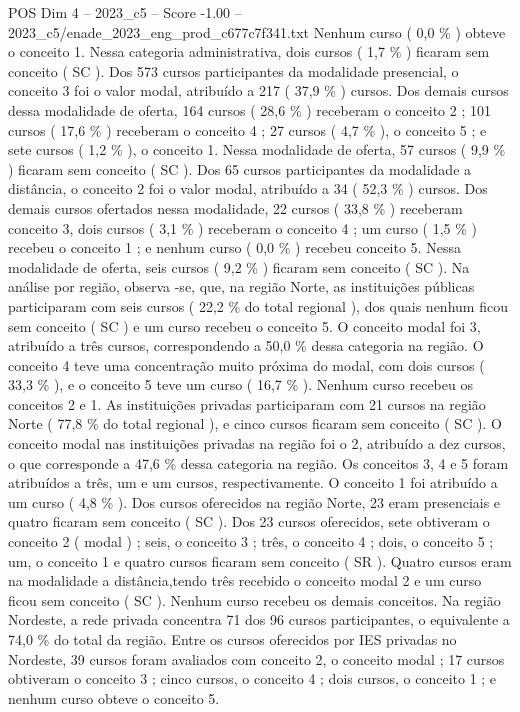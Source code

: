 \begin{textsample}{POS Dim 4 – 2023\_c5 – Score -1.00 – 2023\_c5/enade\_2023\_eng\_prod\_c677c7f341.txt}
Nenhum curso ( 0,0 \% ) obteve o conceito 1.
Nessa categoria administrativa, dois cursos ( 1,7 \% ) ficaram sem conceito ( SC ).
Dos 573 cursos participantes da modalidade presencial, o conceito 3 foi o valor modal, atribuído a 217 ( 37,9 \% ) cursos.
Dos demais cursos dessa modalidade de oferta, 164 cursos ( 28,6 \% ) receberam o conceito 2 ; 101 cursos ( 17,6 \% ) receberam o conceito 4 ; 27 cursos ( 4,7 \% ), o conceito 5 ; e sete cursos ( 1,2 \% ), o conceito 1.
Nessa modalidade de oferta, 57 cursos ( 9,9 \% ) ficaram sem conceito ( SC ).
Dos 65 cursos participantes da modalidade a distância, o conceito 2 foi o valor modal, atribuído a 34 ( 52,3 \% ) cursos.
Dos demais cursos ofertados nessa modalidade, 22 cursos ( 33,8 \% ) receberam conceito 3, dois cursos ( 3,1 \% ) receberam o conceito 4 ; um curso ( 1,5 \% ) recebeu o conceito 1 ; e nenhum curso ( 0,0 \% ) recebeu conceito 5.
Nessa modalidade de oferta, seis cursos ( 9,2 \% ) ficaram sem conceito ( SC ).
Na análise por região, observa -se, que, na região Norte, as instituições públicas participaram com seis cursos ( 22,2 \% do total regional ), dos quais nenhum ficou sem conceito ( SC ) e um curso recebeu o conceito 5.
O conceito modal foi 3, atribuído a três cursos, correspondendo a 50,0 \% dessa categoria na região.
O conceito 4 teve uma concentração muito próxima do modal, com dois cursos ( 33,3 \% ), e o conceito 5 teve um curso ( 16,7 \% ).
Nenhum curso recebeu os conceitos 2 e 1.
As instituições privadas participaram com 21 cursos na região Norte ( 77,8 \% do total regional ), e cinco cursos ficaram sem conceito ( SC ).
O conceito modal nas instituições privadas na região foi o 2, atribuído a dez cursos, o que corresponde a 47,6 \% dessa categoria na região.
Os conceitos 3, 4 e 5 foram atribuídos a três, um e um cursos, respectivamente.
O conceito 1 foi atribuído a um curso ( 4,8 \% ).
Dos cursos oferecidos na região Norte, 23 eram presenciais e quatro ficaram sem conceito ( SC ).
Dos 23 cursos oferecidos, sete obtiveram o conceito 2 ( modal ) ; seis, o conceito 3 ; três, o conceito 4 ; dois, o conceito 5 ; um, o conceito 1 e quatro cursos ficaram sem conceito ( SR ).
Quatro cursos eram na modalidade a distância,tendo três recebido o conceito modal 2 e um curso ficou sem conceito ( SC ).
Nenhum curso recebeu os demais conceitos.
Na região Nordeste, a rede privada concentra 71 dos 96 cursos participantes, o equivalente a 74,0 \% do total da região.
Entre os cursos oferecidos por IES privadas no Nordeste, 39 cursos foram avaliados com conceito 2, o conceito modal ; 17 cursos obtiveram o conceito 3 ; cinco cursos, o conceito 4 ; dois cursos, o conceito 1 ; e nenhum curso obteve o conceito 5.

\end{textsample}
